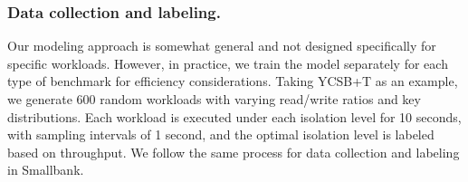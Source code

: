 







\subsubsection{Data collection and labeling. } Our modeling approach is somewhat general and not designed specifically for specific workloads. However, in practice, we train the model separately for each type of benchmark for efficiency considerations. Taking YCSB+T as an example, we generate 600 random workloads with varying read/write ratios and key distributions. 
Each workload is executed under each isolation level for 10 seconds, with sampling intervals of 1 second, and the optimal isolation level is labeled based on throughput. 
We follow the same process for data collection and labeling in Smallbank. 


